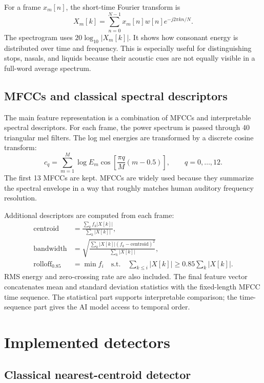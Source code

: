 \documentclass[11pt]{article}
\begin{document}
For a frame $x_m[n]$, the short-time Fourier transform is
\begin{equation}
    X_m[k] = \sum_{n=0}^{N-1} x_m[n]w[n]e^{-j2\pi kn/N}.
\end{equation}
The spectrogram uses $20\log_{10}|X_m[k]|$.  It shows how consonant energy is distributed over time and frequency.  This is especially useful for distinguishing stops, nasals, and liquids because their acoustic cues are not equally visible in a full-word average spectrum.

\subsection{MFCCs and classical spectral descriptors}

The main feature representation is a combination of MFCCs and interpretable spectral descriptors.  For each frame, the power spectrum is passed through 40 triangular mel filters.  The log mel energies are transformed by a discrete cosine transform:
\begin{equation}
    c_q = \sum_{m=1}^{M} \log E_m \cos\left[\frac{\pi q}{M}(m-0.5)\right], \qquad q=0,\ldots,12.
\end{equation}
The first 13 MFCCs are kept.  MFCCs are widely used because they summarize the spectral envelope in a way that roughly matches human auditory frequency resolution.

Additional descriptors are computed from each frame:
\begin{align}
    \text{centroid} &= \frac{\sum_k f_k |X[k]|}{\sum_k |X[k]|}, \\
    \text{bandwidth} &= \sqrt{\frac{\sum_k |X[k]|(f_k-\text{centroid})^2}{\sum_k |X[k]|}}, \\
    \text{rolloff}_{0.85} &= \min f_i \quad \text{s.t.}\quad \sum_{k\le i}|X[k]| \ge 0.85\sum_k |X[k]|.
\end{align}
RMS energy and zero-crossing rate are also included.  The final feature vector concatenates mean and standard deviation statistics with the fixed-length MFCC time sequence.  The statistical part supports interpretable comparison; the time-sequence part gives the AI model access to temporal order.

\section{Implemented detectors}

\subsection{Classical nearest-centroid detector}
\end{document}
